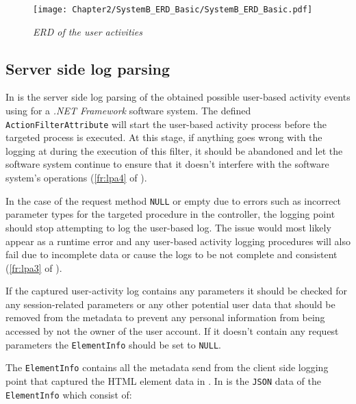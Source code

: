 \begin{figure}[!htb] %
	\centering %
	\texttt{[image: Chapter2/SystemB\_ERD\_Basic/SystemB\_ERD\_Basic.pdf]}
	\caption[ERD of user activities]
	{\textit{ERD of the user activities}}\label{fig:ch2_erdOfEventLogs}
\end{figure}

\subsection{Server side log parsing}
In  is the server side log parsing of the obtained possible user-based activity events using for a \emph{.NET Framework} software system. The defined \texttt{ActionFilterAttribute} will start the user-based activity process before the targeted process is executed. At this stage, if anything goes wrong with the logging at during the execution of this filter, it should be abandoned and let the software system continue to ensure that it doesn't interfere with the software system's operations (\ref{fr:lpa4} of ).\par In the case of the request method \texttt{NULL} or empty due to errors such as incorrect parameter types for the targeted procedure in the controller, the logging point should stop attempting to log the user-based log. The issue would most likely appear as a runtime error and any user-based activity logging procedures will also fail due to incomplete data or cause the logs to be not complete and consistent (\ref{fr:lpa3} of ).\par If the captured user-activity log contains any parameters it should be checked for any session-related parameters or any other potential user data that should be removed from the metadata to prevent any personal information from being accessed by not the owner of the user account. If it doesn't contain any request parameters the \texttt{ElementInfo} should be set to \texttt{NULL}.\par The \texttt{ElementInfo} contains all the metadata send from the client side logging point that captured the HTML element data in . In  is the \texttt{JSON} data of the \texttt{ElementInfo} which consist of:

